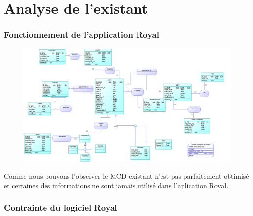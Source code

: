 \part{Analyse de l'existant}


\section{Fonctionnement de l'application Royal}

\begin{figure}[h]
 \centering
 \includegraphics[width=19cm]{MCD_Royal.png}
\end{figure}

Comme nous pouvons l'observer le MCD existant n'est pas parfaitement obtimisé et certaines des informations ne sont jamais utilisé dans l'aplication Royal. 




\section{Contrainte du logiciel Royal}